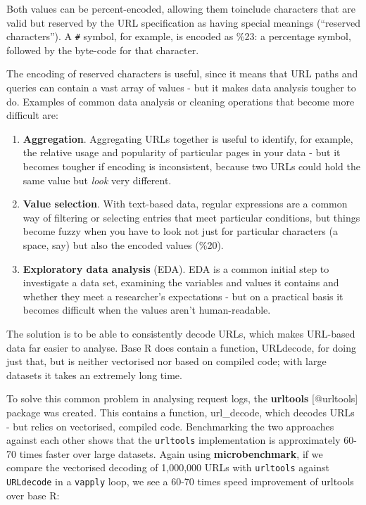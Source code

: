 Both values can be percent-encoded, allowing them toinclude characters
that are valid but reserved by the URL specification as having special
meanings (``reserved characters''). A \texttt{\#} symbol, for example,
is encoded as \%23: a percentage symbol, followed by the byte-code for
that character.

The encoding of reserved characters is useful, since it means that URL
paths and queries can contain a vast array of values - but it makes data
analysis tougher to do. Examples of common data analysis or cleaning
operations that become more difficult are:

\begin{enumerate}
\def\labelenumi{\arabic{enumi}.}
\itemsep1pt\parskip0pt
\item
  \textbf{Aggregation}. Aggregating URLs together is useful to identify,
  for example, the relative usage and popularity of particular pages in
  your data - but it becomes tougher if encoding is inconsistent,
  because two URLs could hold the same value but \emph{look} very
  different.
\item
  \textbf{Value selection}. With text-based data, regular expressions
  are a common way of filtering or selecting entries that meet
  particular conditions, but things become fuzzy when you have to look
  not just for particular characters (a space, say) but also the encoded
  values (\%20).
\item
  \textbf{Exploratory data analysis} (EDA). EDA is a common initial step
  to investigate a data set, examining the variables and values it
  contains and whether they meet a researcher's expectations - but on a
  practical basis it becomes difficult when the values aren't
  human-readable.
\end{enumerate}

The solution is to be able to consistently decode URLs, which makes
URL-based data far easier to analyse. Base R does contain a function,
URLdecode, for doing just that, but is neither vectorised nor based on
compiled code; with large datasets it takes an extremely long time.

To solve this common problem in analysing request logs, the
\textbf{urltools} {[}@urltools{]} package was created. This contains a
function, url\_decode, which decodes URLs - but relies on vectorised,
compiled code. Benchmarking the two approaches against each other shows
that the \texttt{urltools} implementation is approximately 60-70 times
faster over large datasets. Again using \textbf{microbenchmark}, if we
compare the vectorised decoding of 1,000,000 URLs with \texttt{urltools}
against \texttt{URLdecode} in a \texttt{vapply} loop, we see a 60-70
times speed improvement of urltools over base R:


